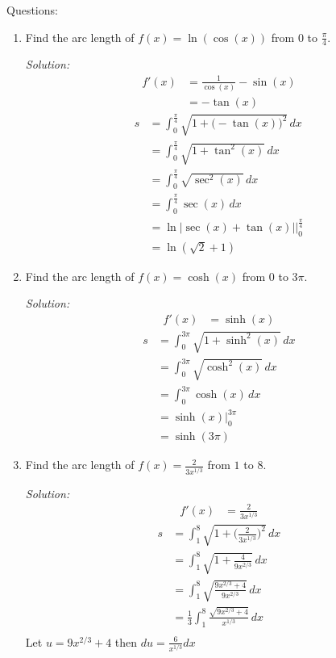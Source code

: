 \documentclass[16pt]{article}
\theoremstyle{remark}
\begin{document}
Questions:
\begin{enumerate}
\item Find the arc length of $f(x) = \ln(\cos(x))$ from $0$ to $\displaystyle{\frac{\pi}{4}}$.
\begin{mdframed}[style=TheoremFrame]
\textit{Solution:}
\begin{align*}
f'(x) &= \frac{1}{\cos(x)} -\sin(x)\\
&= -\tan(x)
\end{align*}
\begin{align*}
s&= \int_0^{\frac{\pi}{4}} \sqrt{1+\big(-\tan(x)\big)^2}\,dx\\
&= \int_0^{\frac{\pi}{4}} \sqrt{1+\tan^2(x)}\, dx\\
&= \int_0^{\frac{\pi}{4}} \sqrt{\sec^2(x)}\, dx\\
&= \int_0^{\frac{\pi}{4}} \sec(x) \, dx\\
&= \ln|\sec(x)+\tan(x)| \bigg|_0^{\frac{\pi}{4}}\\
&= \ln(\sqrt{2}+1)
\end{align*}
\end{mdframed}
\item Find the arc length of $f(x) = \cosh(x)$ from $0$ to $3\pi$.
\begin{mdframed}[style=TheoremFrame]
\textit{Solution:}
\begin{align*}
f'(x) &= \sinh(x)
\end{align*}
\begin{align*}
s &= \int_0^{3\pi} \sqrt{1+\sinh^2(x)}\, dx\\
&= \int_0^{3\pi} \sqrt{\cosh^2(x)}\, dx\\
&=\int_0^{3\pi} \cosh(x)\, dx\\
&=\sinh(x) \bigg|_0^{3\pi}\\
&= \sinh(3\pi)
\end{align*}
\end{mdframed}
\newpage
\item Find the arc length of $\displaystyle{f(x) = \frac{2}{3x^{1/3}}}$ from $1$ to $8$.
\begin{mdframed}[style=TheoremFrame]
\textit{Solution:}
\begin{align*}
f'(x) &= \frac{2}{3x^{1/3}}
\end{align*}
\begin{align*}
s&= \int_1^8 \sqrt{1+\bigg(\frac{2}{3x^{1/3}}\bigg)^2}\, dx\\
&= \int_1^8 \sqrt{1+\frac{4}{9x^{2/3}}}\, dx\\
&= \int_1^8 \sqrt{\frac{9x^{2/3}+4}{9x^{2/3}}}\, dx\\
&= \frac{1}{3}\int_1^8 \frac{\sqrt{9x^{2/3}+4}}{x^{1/3}}\, dx\\
\end{align*}
Let $\displaystyle{u=9x^{2/3}+4}$ then $\displaystyle{du =\frac{6}{x^{1/3}} dx}$\\


\end{mdframed}
\end{enumerate}
\end{document}
